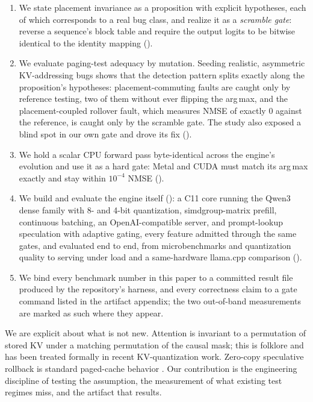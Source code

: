 \documentclass[sigconf,nonacm,screen]{acmart}
\begin{document}
\begin{enumerate}\itemsep2pt
  \item We state placement invariance as a proposition with explicit
  hypotheses, each of which corresponds to a real bug class, and realize it
  as a \emph{scramble gate}: reverse a sequence's block table and require the
  output logits to be bitwise identical to the identity mapping
  ().
  \item We evaluate paging-test adequacy by mutation. Seeding \FaultCount{}
  realistic, asymmetric KV-addressing bugs shows that the detection pattern
  splits exactly along the proposition's hypotheses: placement-commuting
  faults are caught only by reference testing, two of them without ever
  flipping the arg\,max, and the placement-coupled rollover fault, which
  measures NMSE of exactly $0$ against the reference, is caught only by the
  scramble gate. The study also exposed a blind spot in our own gate and
  drove its fix ().
  \item We hold a scalar CPU forward pass byte-identical across the engine's
  evolution and use it as a hard gate: Metal and CUDA must match its
  arg\,max exactly and stay within $10^{-4}$ NMSE ().
  \item We build and evaluate the engine itself (): a C11 core
  running the Qwen3 dense family with 8- and 4-bit quantization,
  simdgroup-matrix prefill, continuous batching, an OpenAI-compatible
  server, and prompt-lookup speculation with adaptive gating, every feature
  admitted through the same gates, and evaluated end to end, from
  microbenchmarks and quantization quality to serving under load and a
  same-hardware llama.cpp comparison ().
  \item We bind every benchmark number in this paper to a committed result
  file produced by the repository's harness, and every correctness claim
  to a gate command listed in the artifact appendix; the two out-of-band
  measurements are marked as such where they appear.
\end{enumerate}

We are explicit about what is not new. Attention is invariant to a
permutation of stored KV under a matching permutation of the causal mask;
this is folklore and has been treated formally in recent KV-quantization
work. Zero-copy speculative rollback is standard paged-cache behavior
\citep{leviathan2023speculative}. Our contribution is the engineering
discipline of testing the assumption, the measurement of what existing test
regimes miss, and the artifact that results.
\end{document}
